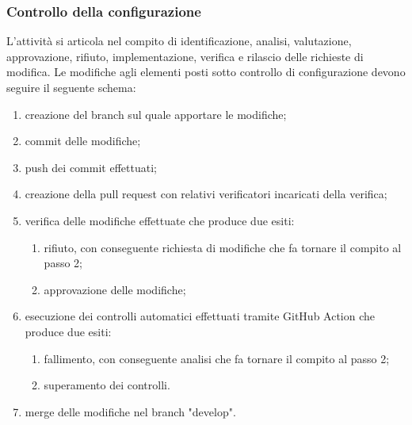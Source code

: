 \subsubsection{Controllo della configurazione}
L'attività si articola nel compito di identificazione, analisi, valutazione, approvazione, rifiuto, implementazione, verifica e rilascio delle richieste di modifica. Le modifiche agli elementi posti sotto controllo di configurazione devono seguire il seguente schema:
\begin{enumerate}
    \item creazione del branch sul quale apportare le modifiche;
    \item commit delle modifiche;
    \item push dei commit effettuati;
    \item creazione della pull request con relativi verificatori incaricati della verifica;
    \item verifica delle modifiche effettuate che produce due esiti:
    \begin{enumerate}
        \item rifiuto, con conseguente richiesta di modifiche che fa tornare il compito al passo 2;
        \item approvazione delle modifiche;
    \end{enumerate}
    \item esecuzione dei controlli automatici effettuati tramite GitHub Action che produce due esiti:
    \begin{enumerate}
        \item fallimento, con conseguente analisi che fa tornare il compito al passo 2;
        \item superamento dei controlli.
    \end{enumerate}
    \item merge delle modifiche nel branch "develop".
\end{enumerate}
